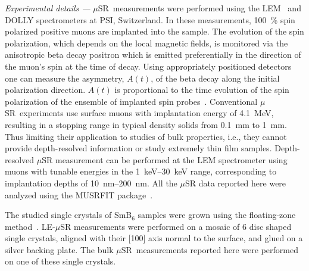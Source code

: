 \documentclass[10pt,aps,prb,twocolumn,showpacs,preprintnumbers,amsmath,amssymb,superscriptaddress,floatfix]{revtex4-1}
\newcommand{\msr}{$\mu$SR}
\newcommand{\lem}{LE-\msr}
\newcommand{\smb}{SmB$_6$}
\newcommand{\mysection}[1]{\smallskip\emph{#1 ---}\phantomsection}
\begin{document}
\mysection{Experimental details}\label{sec:experimental}
%
\msr\ measurements were performed using the
LEM~\cite{Morenzoni1994prl,Prokscha2008nima} and DOLLY spectrometers
at PSI, Switzerland. In these measurements, \SI{100}{\%} spin
polarized positive muons are implanted into the sample. The evolution
of the spin polarization, which depends on the local magnetic fields,
is monitored via the anisotropic beta decay positron which is emitted
preferentially in the direction of the muon's spin at the time of
decay. Using appropriately positioned detectors one can measure the
asymmetry, $A(t)$, of the beta decay along the initial polarization
direction. $A(t)$ is proportional to the time evolution of the spin
polarization of the ensemble of implanted spin
probes~\cite{Yaouanc2010}. Conventional \msr\ experiments use surface
muons with implantation energy of \SI{4.1}{MeV}, resulting in a
stopping range in typical density solids from \SI{0.1}{mm} to
\SI{1}{mm}. Thus limiting their application to studies of bulk
properties, i.e., they cannot provide depth-resolved information or
study extremely thin film samples. Depth-resolved \msr{} measurement
can be performed at the LEM spectrometer using muons with tunable
energies in the \SIrange{1}{30}{\keV} range, corresponding to
implantation depths of \SIrange{10}{200}{\nm}. All the \msr{} data
reported here were analyzed using the MUSRFIT
package~\cite{Suter2012pp}.

The studied single crystals of \smb{} samples were grown using the
floating-zone method~\cite{CiomagaHatnean2013sr}. \lem{} measurements
were performed on a mosaic of 6 disc shaped single crystals, aligned
with their [100] axis normal to the surface, and glued on a silver
backing plate. The bulk \msr\ measurements reported here were
performed on one of these single crystals.
\end{document}

